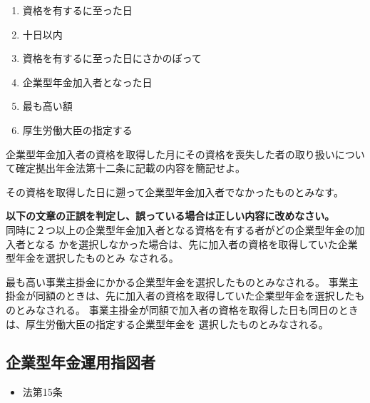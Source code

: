 \begin{answerbox}
  \begin{enumerate}[A:]
    \item 資格を有するに至った日
    \item 十日以内
    \item 資格を有するに至った日にさかのぼって
    \item 企業型年金加入者となった日
    \item 最も高い額
    \item 厚生労働大臣の指定する
  \end{enumerate}
\end{answerbox}

\begin{shortanswer}[自作 2026/10/17]
  企業型年金加入者の資格を取得した月にその資格を喪失した者の取り扱いについて確定拠出年金法第十二条に記載の内容を簡記せよ。
\end{shortanswer}

\begin{answerbox}
  その資格を取得した日に遡って企業型年金加入者でなかったものとみなす。
\end{answerbox}

\begin{truefalse}[年金1 H29 問題2(2)\textcircled{1}]
    \textbf{以下の文章の正誤を判定し、誤っている場合は正しい内容に改めなさい。}
\\  

  同時に２つ以上の企業型年金加入者となる資格を有する者がどの企業型年金の加入者となる
かを選択しなかった場合は、先に加入者の資格を取得していた企業型年金を選択したものとみ
なされる。
\end{truefalse}

\begin{answerbox}
  最も高い事業主掛金にかかる企業型年金を選択したものとみなされる。
  事業主掛金が同額のときは、先に加入者の資格を取得していた企業型年金を選択したものとみなされる。
  事業主掛金が同額で加入者の資格を取得した日も同日のときは、厚生労働大臣の指定する企業型年金を
  選択したものとみなされる。
\end{answerbox}

\newpage

\subsection{企業型年金運用指図者}

\begin{InyouJobunbox}
  \begin{itemize}
    \item 法第15条
  \end{itemize}
\end{InyouJobunbox}

